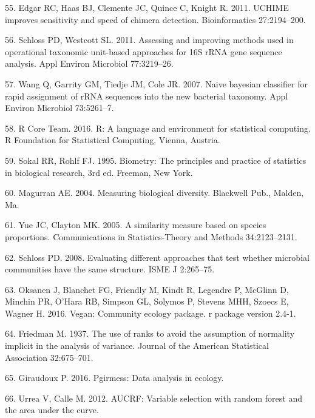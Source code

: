 \documentclass[11pt,]{article}
\begin{document}
\hypertarget{ref-edgar_uchime_2011}{}
55. Edgar RC, Haas BJ, Clemente JC, Quince C, Knight R. 2011. UCHIME
improves sensitivity and speed of chimera detection. Bioinformatics
27:2194--200.

\hypertarget{ref-schloss_OTUanalysis_2011}{}
56. Schloss PD, Westcott SL. 2011. Assessing and improving methods used
in operational taxonomic unit-based approaches for 16S rRNA gene
sequence analysis. Appl Environ Microbiol 77:3219--26.

\hypertarget{ref-wang_taxonomy_2007}{}
57. Wang Q, Garrity GM, Tiedje JM, Cole JR. 2007. Naive bayesian
classifier for rapid assignment of rRNA sequences into the new bacterial
taxonomy. Appl Environ Microbiol 73:5261--7.

\hypertarget{ref-R}{}
58. R Core Team. 2016. R: A language and environment for statistical
computing. R Foundation for Statistical Computing, Vienna, Austria.

\hypertarget{ref-sokal_biometrystats_1995}{}
59. Sokal RR, Rohlf FJ. 1995. Biometry: The principles and practice of
statistics in biological research, 3rd ed. Freeman, New York.

\hypertarget{ref-magurran_measuring_2004}{}
60. Magurran AE. 2004. Measuring biological diversity. Blackwell Pub.,
Malden, Ma.

\hypertarget{ref-yue_thetaYC_2005}{}
61. Yue JC, Clayton MK. 2005. A similarity measure based on species
proportions. Communications in Statistics-Theory and Methods
34:2123--2131.

\hypertarget{ref-schloss_commstruct_2008}{}
62. Schloss PD. 2008. Evaluating different approaches that test whether
microbial communities have the same structure. ISME J 2:265--75.

\hypertarget{ref-oksanen_vegan_2016}{}
63. Oksanen J, Blanchet FG, Friendly M, Kindt R, Legendre P, McGlinn D,
Minchin PR, O'Hara RB, Simpson GL, Solymos P, Stevens MHH, Szoecs E,
Wagner H. 2016. Vegan: Community ecology package. r package version
2.4-1.

\hypertarget{ref-friedman_1937}{}
64. Friedman M. 1937. The use of ranks to avoid the assumption of
normality implicit in the analysis of variance. Journal of the American
Statistical Association 32:675--701.

\hypertarget{ref-pgirmess}{}
65. Giraudoux P. 2016. Pgirmess: Data analysis in ecology.

\hypertarget{ref-AUCRF}{}
66. Urrea V, Calle M. 2012. AUCRF: Variable selection with random forest
and the area under the curve.
\end{document}
